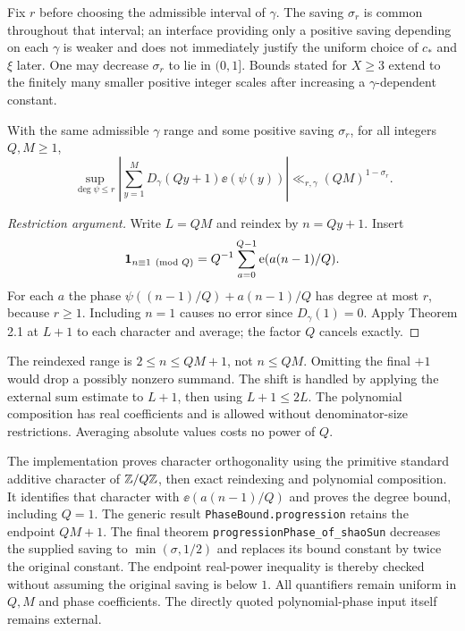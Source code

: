 Fix $r$ before choosing the admissible interval of $\gamma$. The saving $\sigma_r$ is common throughout that interval; an interface providing only a positive saving depending on each $\gamma$ is weaker and does not immediately justify the uniform choice of $c_*$ and $\xi$ later. One may decrease $\sigma_r$ to lie in $(0,1]$. Bounds stated for $X\geq3$ extend to the finitely many smaller positive integer scales after increasing a $\gamma$-dependent constant.
\fi

\begin{lemma}\label{l:progression-phase}
\leanok
With the same admissible $\gamma$ range and some positive saving $\sigma_r$, for all integers $Q,M\geq1$,
\[
 \sup_{\deg\psi\leq r}
 \left|\sum_{y=1}^{M}D_\gamma(Qy+1)\ee(\psi(y))\right|
 \ll_{r,\gamma}(QM)^{1-\sigma_r}.
\]
\end{lemma}
\begin{proof}[Restriction argument]
\leanok
Write $L=QM$ and reindex by $n=Qy+1$. Insert
\[
 \mathbf 1_{n\equiv1\pmod Q}=Q^{-1}\sum_{a=0}^{Q-1}\mathrm e(a(n-1)/Q).
\]
For each $a$ the phase $\psi((n-1)/Q)+a(n-1)/Q$ has degree at most $r$, because $r\geq1$. Including $n=1$ causes no error since $D_\gamma(1)=0$. Apply Theorem 2.1 at $L+1$ to each character and average; the factor $Q$ cancels exactly.
\end{proof}
\ifDetailed
The reindexed range is $2\leq n\leq QM+1$, not $n\leq QM$. Omitting the final $+1$ would drop a possibly nonzero summand. The shift is handled by applying the external sum estimate to $L+1$, then using $L+1\leq2L$. The polynomial composition has real coefficients and is allowed without denominator-size restrictions. Averaging absolute values costs no power of $Q$.

The implementation proves character orthogonality using the primitive standard additive character of $\mathbb Z/Q\mathbb Z$, then exact reindexing and polynomial composition. It identifies that character with $\ee(a(n-1)/Q)$ and proves the degree bound, including $Q=1$. The generic result \texttt{PhaseBound.progression} retains the endpoint $QM+1$. The final theorem \texttt{progressionPhase\_\allowbreak{}of\_\allowbreak{}shaoSun} decreases the supplied saving to $\min(\sigma,1/2)$ and replaces its bound constant by twice the original constant. The endpoint real-power inequality is thereby checked without assuming the original saving is below $1$. All quantifiers remain uniform in $Q,M$ and phase coefficients. The directly quoted polynomial-phase input itself remains external.
\fi


